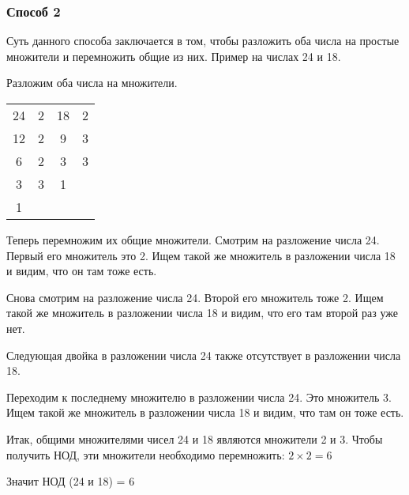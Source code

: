 \documentclass[12pt]{article}
\begin{document}
    \subsubsection{Способ 2}
    Суть данного способа заключается в том, чтобы разложить оба числа на простые множители и перемножить общие из них. Пример на числах 24 и 18.\par
    Разложим оба числа на множители.\par
    \begin{tabular}{c|cc|c}
        24 & 2 & 18 & 2 \\
        12 & 2 & 9 & 3 \\
        6 & 2 & 3 & 3 \\
        3 & 3 & 1 \\
        1
    \end{tabular}\par
    Теперь перемножим их общие множители. Смотрим на разложение числа 24. Первый его множитель это 2. Ищем такой же множитель в разложении числа 18 и видим, что он там тоже есть.\par
    Снова смотрим на разложение числа 24. Второй его множитель тоже 2. Ищем такой же множитель в разложении числа 18 и видим, что его там второй раз уже нет.\par
    Следующая двойка в разложении числа 24 также отсутствует в разложении числа 18.\par
    Переходим к последнему множителю в разложении числа 24. Это множитель 3. Ищем такой же множитель в разложении числа 18 и видим, что там он тоже есть.\par
    Итак, общими множителями чисел 24 и 18 являются множители 2 и 3. Чтобы получить НОД, эти множители необходимо перемножить: $2 \times 2 = 6$\par
    Значит НОД (24 и 18) = 6\par
\end{document}
